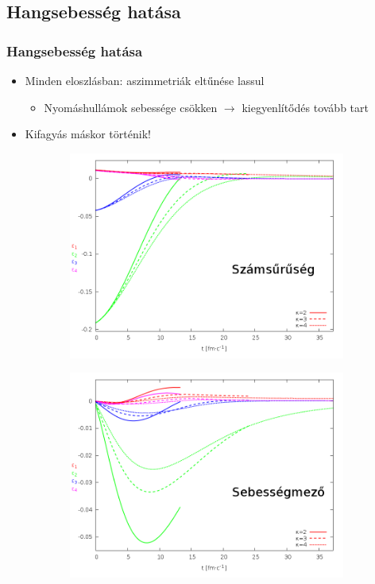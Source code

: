 \documentclass{beamer}
\begin{document}
\subsection{Hangsebesség hatása}
\begin{frame}
\frametitle{Hangsebesség hatása}
\begin{center}
\begin{itemize}
\setlength{\itemsep}{12pt}
\item<1-> Minden eloszlásban: aszimmetriák eltűnése lassul
\vspace{8pt}
\begin{itemize}
\item<1-> Nyomáshullámok sebessége csökken $\rightarrow$ kiegyenlítődés tovább tart
\end{itemize}
\item<2-> Kifagyás máskor történik!
\end{itemize}
\begin{figure}[H]
	\centering
    \begin{subfigure}[b]{0.49\textwidth}
    		\includegraphics[width=\textwidth]{pic/res/rel/eps_kappa_n}
	\end{subfigure}
	\begin{subfigure}[b]{0.49\textwidth}
        	\includegraphics[width=\textwidth]{pic/res/rel/eps_kappa_v}

\end{subfigure}
\end{figure}
\end{center}
\end{frame}
\end{document}
